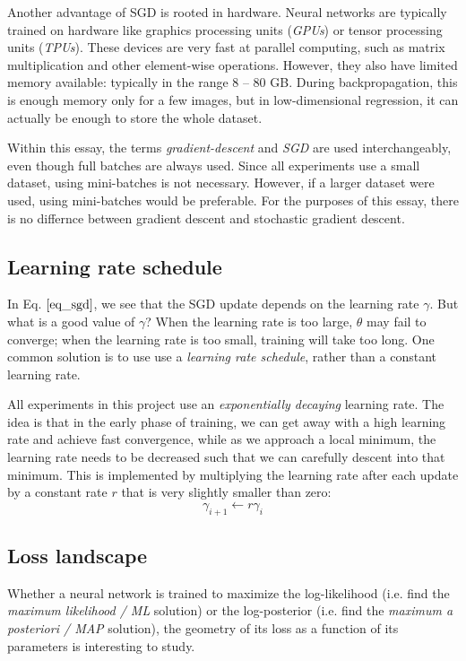 \documentclass[12pt]{article}
\begin{document}
Another advantage of SGD is rooted in hardware. Neural networks are typically trained on hardware like graphics processing units (\textit{GPUs}) or tensor processing units (\textit{TPUs}). These devices are very fast at parallel computing, such as matrix multiplication and other element-wise operations. However, they also have limited memory available: typically in the range 8 -- 80 GB. During backpropagation, this is enough memory only for a few images, but in low-dimensional regression, it can actually be enough to store the whole dataset.

Within this essay, the terms \textit{gradient-descent} and \textit{SGD} are used interchangeably, even though full batches are always used. Since all experiments use a small dataset, using mini-batches is not necessary. However, if a larger dataset were used, using mini-batches would be preferable. For the purposes of this essay, there is no differnce between gradient descent and stochastic gradient descent. 

\subsection{Learning rate schedule}

In Eq. $\ref{eq_sgd}$, we see that the SGD update depends on the learning rate $\gamma$. But what is a good value of $\gamma$? When the learning rate is too large, $\theta$ may fail to converge; when the learning rate is too small, training will take too long. One common solution is to use use a \textit{learning rate schedule}, rather than a constant learning rate.

All experiments in this project use an \textit{exponentially decaying} learning rate. The idea is that in the early phase of training, we can get away with a high learning rate and achieve fast convergence, while as we approach a local minimum, the learning rate needs to be decreased such that we can carefully descent into that minimum. This is implemented by multiplying the learning rate after each update by a constant rate $r$ that is very slightly smaller than zero:
$$
\gamma_{i+1} \leftarrow r \gamma_i
$$

\subsection{Loss landscape}

Whether a neural network is trained to maximize the log-likelihood (i.e. find the \textit{maximum likelihood / ML} solution) or the log-posterior (i.e. find the \textit{maximum a posteriori / MAP} solution), the geometry of its loss as a function of its parameters is interesting to study.
\end{document}
